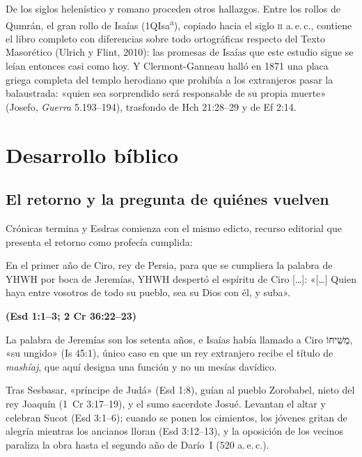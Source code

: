 \documentclass[11pt,letterpaper]{article}
\newcommand{\heb}[1]{\mbox{\foreignlanguage{hebrew}{#1}}}
\newcommand{\fuente}[1]{\par\hfill{\upshape\bfseries\small\textcolor{ladrillo}{#1}}}
\begin{document}
De los siglos helenístico y romano proceden otros hallazgos. Entre los rollos de Qumrán, el gran rollo de Isaías (1QIsa\textsuperscript{a}), copiado hacia el siglo \textsc{ii} a.\,e.\,c., contiene el libro completo con diferencias sobre todo ortográficas respecto del Texto Masorético (Ulrich y Flint, 2010): las promesas de Isaías que este estudio sigue se leían entonces casi como hoy. Y Clermont-Ganneau halló en 1871 una placa griega completa del templo herodiano que prohibía a los extranjeros pasar la balaustrada: «quien sea sorprendido será responsable de su propia muerte» (Josefo, \emph{Guerra} 5.193--194), trasfondo de Hch 21:28--29 y de Ef 2:14.

\section{Desarrollo bíblico}

\subsection{El retorno y la pregunta de quiénes vuelven}
Crónicas termina y Esdras comienza con el mismo edicto, recurso editorial que presenta el retorno como profecía cumplida:
\begin{cita}En el primer año de Ciro, rey de Persia, para que se cumpliera la palabra de YHWH por boca de Jeremías, YHWH despertó el espíritu de Ciro [\ldots]: «[\ldots] Quien haya entre vosotros de todo su pueblo, sea su Dios con él, y suba».\fuente{(Esd 1:1--3; 2 Cr 36:22--23)}\end{cita}
La palabra de Jeremías son los setenta años, e Isaías había llamado a Ciro \heb{מְשִׁיחוֹ}, «su ungido» (Is 45:1), único caso en que un rey extranjero recibe el título de \emph{mashíaj}, que aquí designa una función y no un mesías davídico.

Tras Sesbasar, «príncipe de Judá» (Esd 1:8), guían al pueblo Zorobabel, nieto del rey Joaquín (1~Cr 3:17--19), y el sumo sacerdote Josué. Levantan el altar y celebran Sucot (Esd 3:1--6); cuando se ponen los cimientos, los jóvenes gritan de alegría mientras los ancianos lloran (Esd 3:12--13), y la oposición de los vecinos paraliza la obra hasta el segundo año de Darío~I (520 a.\,e.\,c.).
\end{document}
